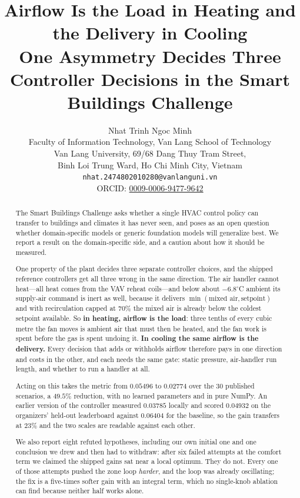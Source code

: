 \documentclass[10pt]{article}
\title{\textbf{Airflow Is the Load in Heating and the Delivery in Cooling}\\[2pt]
\large One Asymmetry Decides Three Controller Decisions in the Smart
Buildings Challenge}
\author{%
  Nhat Trinh Ngoc Minh\\[2pt]
  \small Faculty of Information Technology, Van Lang School of Technology\\
  \small Van Lang University, 69/68 Dang Thuy Tram Street,\\
  \small Binh Loi Trung Ward, Ho Chi Minh City, Vietnam\\[2pt]
  \small\texttt{nhat.2474802010280@vanlanguni.vn}\\
  \small ORCID: \href{https://orcid.org/0009-0006-9477-9642}{0009-0006-9477-9642}
}
\date{}
\begin{document}
\maketitle

\begin{abstract}
The Smart Buildings Challenge asks whether a single HVAC control policy can
transfer to buildings and climates it has never seen, and poses as an open
question whether domain-specific models or generic foundation models will
generalize best. We report a result on the domain-specific side, and a caution
about how it should be measured.

One property of the plant decides three separate controller choices, and the
shipped reference controllers get all three wrong in the same direction. The
air handler cannot heat---all heat comes from the VAV reheat coils---and below
about $-6.8^{\circ}$C ambient its supply-air command is inert as well, because
it delivers $\min(\text{mixed air}, \text{setpoint})$ and with recirculation
capped at $70\%$ the mixed air is already below the coldest setpoint
available. So \textbf{in heating, airflow is the load}: three tenths of every
cubic metre the fan moves is ambient air that must then be heated, and the fan
work is spent before the gas is spent undoing it. \textbf{In cooling the same
airflow is the delivery.} Every decision that adds or withholds airflow
therefore pays in one direction and costs in the other, and each needs the same
gate: static pressure, air-handler run length, and whether to run a handler at
all.

Acting on this takes the metric from $0.05496$ to $0.02774$ over the 30
published scenarios, a $49.5\%$ reduction, with no learned parameters and in
pure NumPy. An earlier version of the controller measured $0.03785$ locally
and scored $0.04932$ on the organizers' held-out leaderboard against
$0.06404$ for the baseline, so the gain transfers at $23\%$ and the two scales
are readable against each other.

We also report eight refuted hypotheses, including our own initial one and one
conclusion we drew and then had to withdraw: after six failed attempts at the
comfort term we claimed the shipped gains sat near a local optimum. They do
not. Every one of those attempts pushed the zone loop \emph{harder}, and the
loop was already oscillating; the fix is a five-times softer gain with an
integral term, which no single-knob ablation can find because neither half
works alone.
\end{abstract}
\end{document}
